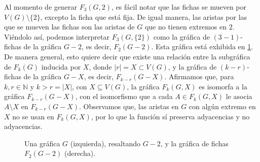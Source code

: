 Al momento de generar $F_3(G,2)$, es f\'acil notar que las fichas se mueven por
$V(G) \setminus \{2\}$, excepto la ficha que est\'a fija. De igual manera, las
aristas por las que se mueven las fichas son las aristas de $G$ que no tienen
extremos en $2$. Vi\'endolo as\'i, podemos interpretar $F_3(G,\{2\})$ como la
gr\'afica de $(3-1)$-fichas de la gr\'afica $G-2$, es decir, $F_2(G-2)$. Esta
gr\'afica est\'a exhibida en \cref{fig:ex-tok-subgraph-aux}. De manera general,
esto quiere decir que existe una relaci\'on entre la subgr\'afica de $F_k(G)$
inducida por $X$, donde $|r|=X \subset V(G)$, y la gr\'afica de $(k-r)$-fichas
de la gr\'afica $G-X$, es decir, $F_{k-r}(G-X)$. Afirmamos que, para $k,r \in
\mathbb{N}$ y $k>r = |X|$, con $X \subseteq V(G)$, la gr\'afica $F_k(G,X)$ es
isomorfa a la gr\'afica $F_{k-r}(G-X)$, con el isomorfismo que a cada $A \in
F_k(G,X)$ le asocia $A \setminus X$ en $F_{k-r}(G-X)$.   Observamos que, las
aristas en $G$ con alg\'un extremo en $X$ no se usan en $F_k(G,X)$, por lo que
la funci\'on s\'i preserva adyacencias y no adyacencias.

\begin{figure}[ht!]
    \centering
    \caption{Una gr\'afica $G$ (izquierda), resaltando $G-2$, y la 
    gr\'afica de fichas $F_2(G-2)$ (derecha).}
    \label{fig:ex-tok-subgraph-aux}
\end{figure}

